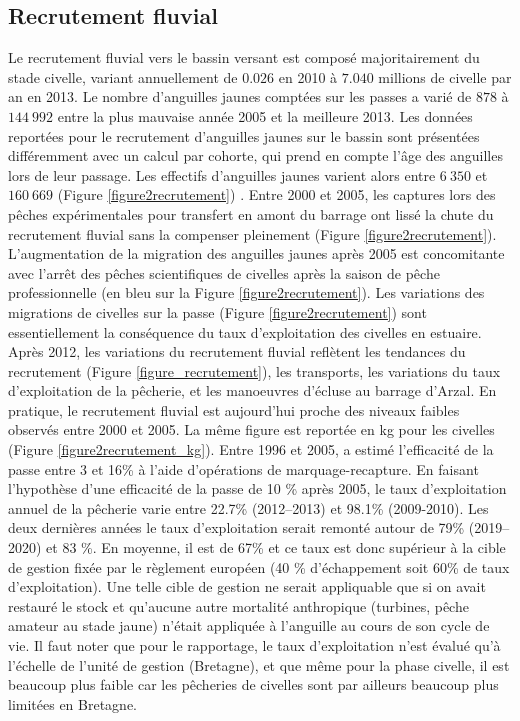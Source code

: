 \documentclass[10pt,twocolumn,titlepage,twoside]{article}\usepackage[]{graphicx}\usepackage[]{color}
\begin{document}
\subsection{Recrutement fluvial}


Le recrutement fluvial vers le bassin versant
est composé majoritairement du stade civelle, variant annuellement de
$0.026$ en 2010 à
$7.040$ millions de civelle par an en 
2013. 
Le nombre d'anguilles jaunes comptées sur les passes a varié de
$878$ à  $144~992$
entre la plus mauvaise année 2005 et la meilleure
2013. Les données reportées pour le recrutement
d'anguilles jaunes sur le bassin sont présentées différemment avec un calcul par
cohorte, qui prend en compte l'âge des anguilles lors de leur passage. Les
effectifs d'anguilles jaunes varient alors entre
$6~350$ et $160~669$ 
(Figure \ref{figure2recrutement}) \citep{briand_gestion_2017}.
Entre 2000 et 2005, les captures lors des pêches expérimentales pour
transfert en amont du barrage ont lissé la chute du recrutement fluvial sans la
compenser pleinement (Figure \ref{figure2recrutement}). L'augmentation de la
migration des anguilles jaunes après 2005 est concomitante avec
l'arrêt des pêches scientifiques de civelles
après la saison de pêche professionnelle (en bleu sur la Figure
\ref{figure2recrutement}). Les variations des migrations de civelles sur la
passe (Figure \ref{figure2recrutement}) sont essentiellement la conséquence du taux
d'exploitation des civelles en estuaire.
Après 2012, les variations du recrutement fluvial reflètent les tendances du
recrutement (Figure \ref{figure_recrutement}), les transports, les variations
du taux d'exploitation de la pêcherie, et les manoeuvres d'écluse au barrage
d'Arzal. En pratique, le recrutement fluvial est aujourd'hui proche des
niveaux faibles observés entre 2000 et 2005. La même figure est reportée en kg
pour les civelles (Figure \ref{figure2recrutement_kg}).
Entre 1996 et 2005, \citet{briand_dynamique_2009} a estimé l'efficacité de la
passe entre 3 et 16\% à l'aide d'opérations de marquage-recapture. En faisant
l'hypothèse d'une efficacité de la passe de 10 \% après 2005, le taux
d'exploitation annuel de la pêcherie varie entre 22.7\% (2012--2013) et 98.1\%
(2009-2010). Les deux dernières années le taux d'exploitation serait remonté autour de 79\%
(2019--2020) et 83 \%. En moyenne, il est de 67\% et ce taux est donc supérieur
à la cible de gestion fixée par le règlement européen (40 \% d'échappement soit
60\% de taux d'exploitation). Une telle cible de gestion ne serait appliquable
que si on avait restauré le stock et qu'aucune autre mortalité anthropique
(turbines, pêche amateur au stade jaune) n'était appliquée à l'anguille au
cours de son cycle de vie.
Il faut noter que pour le rapportage, le taux d'exploitation n'est évalué qu'à l'échelle 
de l'unité de gestion (Bretagne), et que même pour la phase civelle, il est
beaucoup plus faible car les pêcheries de civelles sont par ailleurs beaucoup
plus limitées en Bretagne.
\end{document}
